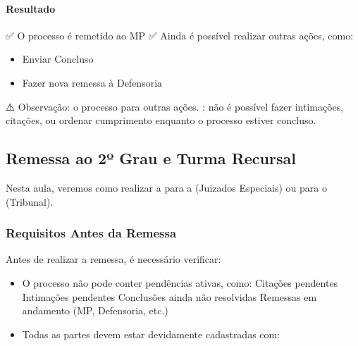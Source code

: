 \documentclass[letterpaper,10pt,brazil]{sphinxmanual}
\begin{document}
\paragraph{Resultado}
\label{\detokenize{projud_36_realizarremessa:resultado}}
\sphinxAtStartPar
✅ O processo é remetido ao MP
✅ Ainda é possível realizar outras ações, como:
\begin{itemize}
\item {} 
\sphinxAtStartPar
Enviar Concluso

\item {} 
\sphinxAtStartPar
Fazer nova remessa à Defensoria

\end{itemize}

\sphinxAtStartPar
⚠️ Observação:
\sphinxhyphen{}  o processo para outras ações.
\sphinxhyphen{} : não é possível fazer intimações, citações, ou ordenar cumprimento enquanto o processo estiver concluso.

\sphinxstepscope


\subsection{Remessa ao 2º Grau e Turma Recursal}
\label{\detokenize{projud_37_remessasegundograu:remessa-ao-2o-grau-e-turma-recursal}}\label{\detokenize{projud_37_remessasegundograu::doc}}
\sphinxAtStartPar
Nesta aula, veremos como realizar a  para a  (Juizados Especiais) ou para o  (Tribunal).


\subsubsection{Requisitos Antes da Remessa}
\label{\detokenize{projud_37_remessasegundograu:requisitos-antes-da-remessa}}
\sphinxAtStartPar
Antes de realizar a remessa, é necessário verificar:
\begin{description}
\begin{itemize}
\item {} 
\sphinxAtStartPar
O processo não pode conter pendências ativas, como:
\sphinxhyphen{} Citações pendentes
\sphinxhyphen{} Intimações pendentes
\sphinxhyphen{} Conclusões ainda não resolvidas
\sphinxhyphen{} Remessas em andamento (MP, Defensoria, etc.)

\end{itemize}

\begin{itemize}
\item {} 
\sphinxAtStartPar
Todas as partes devem estar devidamente cadastradas com:
\sphinxhyphen{} 
\sphinxhyphen{} 
\sphinxhyphen{} 

\end{itemize}

\end{description}
\end{document}
